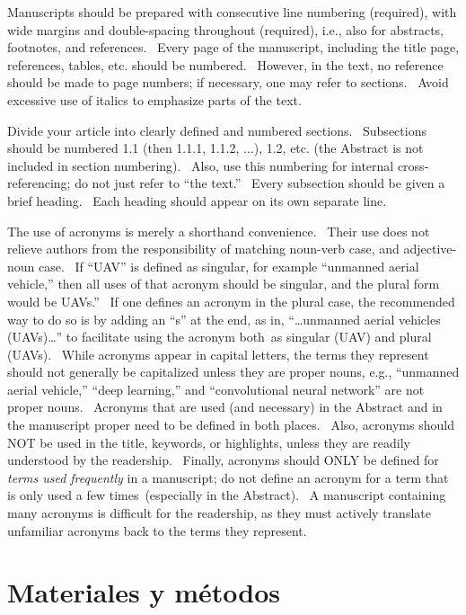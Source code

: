 \documentclass[10pt,authoryear]{elsarticle}
\begin{document}
{		{\color{black}
			Manuscripts should be prepared with consecutive line numbering (required), with wide margins and double-spacing throughout (required), i.e., also for abstracts, footnotes, and references. \ Every page of the manuscript, including the title page, references, tables, etc. should be numbered. \ However, in the text, no reference should be made to page numbers; if necessary, one may refer to sections. \ Avoid excessive use of italics to emphasize parts of the text.}
		
		{\color{black}
			Divide your article into clearly defined and numbered sections. \ Subsections should be numbered 1.1 (then 1.1.1, 1.1.2, ...), 1.2, etc. (the Abstract is not included in section numbering). \ Also, use this numbering for internal cross-referencing; do not just refer to “the text.” \ Every subsection should be given a brief heading. \ Each heading should appear on its own separate line.}
		
		{\color{black}
			The use of acronyms is merely a shorthand convenience. \ Their use does not relieve authors from the responsibility of matching noun-verb case, and adjective-noun case. \ If “UAV” is defined as singular, for example “unmanned aerial vehicle,” then all uses of that acronym should be singular, and the plural form would be {\textquotedbl}UAVs.” \ If one defines an acronym in the plural case, the recommended way to do so is by adding an “s” at the end, as in, “…unmanned aerial vehicles (UAVs)…” to facilitate using the acronym both as singular (UAV) and plural (UAVs).  While acronyms appear in capital letters, the terms they represent should not generally be capitalized unless they are proper nouns, e.g., “unmanned aerial vehicle,” “deep learning,” and “convolutional neural network” are not proper nouns. \ Acronyms that are used (and necessary) in the Abstract and in the manuscript proper need to be defined in both places. \ Also, acronyms should NOT be used in the title, keywords, or highlights, unless they are readily understood by the readership. \ Finally, acronyms should ONLY be defined for \textit{terms used frequently} in a manuscript; do not define an acronym for a term that is only used a few times (especially in the Abstract). \ A manuscript containing many acronyms is difficult for the readership, as they must actively translate unfamiliar acronyms back to the terms they represent.}
		\fi
		
		\bigskip
		
		
		\section{Materiales y métodos}
		\label{Sec:Methods}
		
		\iffalse
}
\end{document}
